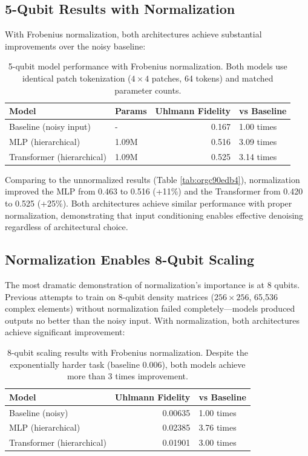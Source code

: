 \documentclass[11pt]{article}
\begin{document}
\subsection{5-Qubit Results with Normalization}
\label{sec:org6e29263}

With Frobenius normalization, both architectures achieve substantial improvements over the noisy baseline:

\begin{table}[htbp]
\caption{\label{tab:org46edc70}5-qubit model performance with Frobenius normalization. Both models use identical patch tokenization (\(4\times 4\) patches, 64 tokens) and matched parameter counts.}
\centering
\begin{tabular}{llrl}
Model & Params & Uhlmann Fidelity & vs Baseline\\[0pt]
\hline
Baseline (noisy input) & - & 0.167 & 1.00 times\\[0pt]
MLP (hierarchical) & 1.09M & 0.516 & 3.09 times\\[0pt]
Transformer (hierarchical) & 1.09M & 0.525 & 3.14 times\\[0pt]
\end{tabular}
\end{table}

Comparing to the unnormalized results (Table \ref{tab:orgc90edb4}), normalization improved the MLP from 0.463 to 0.516 (+11\%) and the Transformer from 0.420 to 0.525 (+25\%). Both architectures achieve similar performance with proper normalization, demonstrating that input conditioning enables effective denoising regardless of architectural choice.

\subsection{Normalization Enables 8-Qubit Scaling}
\label{sec:org2dd080b}

The most dramatic demonstration of normalization's importance is at 8 qubits. Previous attempts to train on 8-qubit density matrices (\(256\times 256\), 65,536 complex elements) without normalization failed completely---models produced outputs no better than the noisy input. With normalization, both architectures achieve significant improvement:

\begin{table}[htbp]
\caption{\label{tab:org851c7c1}8-qubit scaling results with Frobenius normalization. Despite the exponentially harder task (baseline 0.006), both models achieve more than 3 times improvement.}
\centering
\begin{tabular}{lrl}
Model & Uhlmann Fidelity & vs Baseline\\[0pt]
\hline
Baseline (noisy) & 0.00635 & 1.00 times\\[0pt]
MLP (hierarchical) & 0.02385 & 3.76 times\\[0pt]
Transformer (hierarchical) & 0.01901 & 3.00 times\\[0pt]
\end{tabular}
\end{table}
\end{document}
